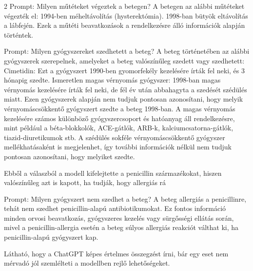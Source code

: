 \documentclass{article}
\begin{document}
\begin{multicols}{2}
Prompt: Milyen műtéteket végeztek a betegen?
A betegen az alábbi műtéteket végezték el:
1994-ben méheltávolítás (hysterektómia).
1998-ban bütyök eltávolítás a lábfején.
Ezek a műtéti beavatkozások a rendelkezésre álló információk alapján történtek.

Prompt: Milyen gyógyszereket szedhetett a beteg?
A beteg történetében az alábbi gyógyszerek szerepelnek, amelyeket a beteg valószínűleg szedett vagy szedhetett:
Cimetidin: Ezt a gyógyszert 1990-ben gyomorfekély kezelésére írták fel neki, és 3 hónapig szedte.
Ismeretlen magas vérnyomás gyógyszer: 1998-ban magas vérnyomás kezelésére írták fel neki, de fél év után abbahagyta a szedését szédülés miatt.
Ezen gyógyszerek alapján nem tudjuk pontosan azonosítani, hogy melyik vérnyomáscsökkentő gyógyszert szedte a beteg 1998-ban. A magas vérnyomás kezelésére számos különböző gyógyszercsoport és hatóanyag áll rendelkezésre, mint például a béta-blokkolók, ACE-gátlók, ARB-k, kalciumcsatorna-gátlók, tiazid-diuretikumok stb. A szédülés sokféle vérnyomáscsökkentő gyógyszer mellékhatásaként is megjelenhet, így további információk nélkül nem tudjuk pontosan azonosítani, hogy melyiket szedte.

Ebből a válaszból a modell kifelejtette a penicillin származékokat, hiszen valószínűleg azt is kapott, ha tudják, hogy allergiás rá

Prompt: Milyen gyógyszert nem szedhet a beteg?
A beteg allergiás a penicillinre, tehát nem szedhet penicillin-alapú antibiotikumokat.
Ez fontos információ minden orvosi beavatkozás, gyógyszeres kezelés vagy sürgősségi ellátás során, mivel a penicillin-allergia esetén a beteg súlyos allergiás reakciót válthat ki, ha penicillin-alapú gyógyszert kap.

Látható, hogy a ChatGPT képes értelmes összegzést írni, bár egy eset nem mérvadó jól szemlélteti a modellben rejlő lehetőségeket.


\end{multicols}
\end{document}
